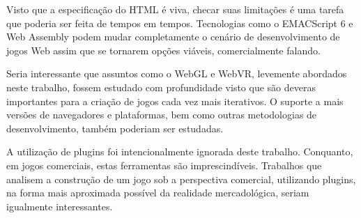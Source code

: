 Visto que a especificação do HTML é viva, checar suas limitações
é uma tarefa que poderia ser feita de tempos em tempos. Tecnologias
como o EMACScript 6 e Web Assembly podem mudar completamente o cenário
de desenvolvimento de jogos Web assim que se tornarem opções viáveis,
comercialmente falando.

Seria interessante que assuntos como o WebGL e WebVR, levemente
abordados neste trabalho, fossem estudado com profundidade visto que
são deveras importantes para a criação de jogos cada vez mais
iterativos. O suporte a mais versões de navegadores e plataformas,
bem como outras metodologias de desenvolvimento, também poderiam ser
estudadas.

A utilização de plugins foi intencionalmente ignorada deste
trabalho. Conquanto, em jogos comerciais, estas ferramentas são
imprescindíveis. Trabalhos que analisem a construção de um jogo sob
a perspectiva comercial, utilizando plugins, na forma mais aproximada
possível da realidade mercadológica, seriam igualmente interessantes.

